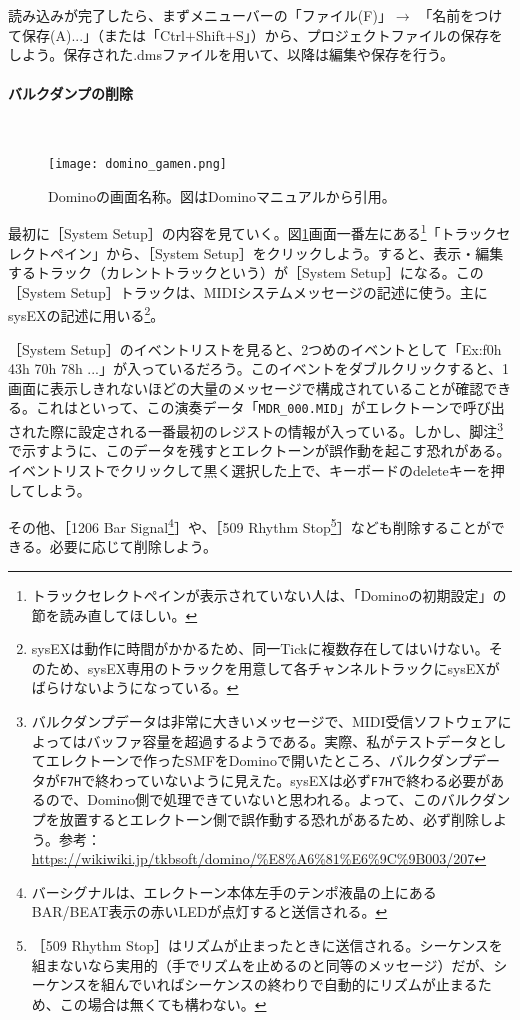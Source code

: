 \documentclass[uplatex, 10pt, dvipdfmx]{jsarticle}
\numberwithin{equation}{section}
\newcommand{\emphj}[1]{\textbf{\textrm{\textgt{{#1}}}}}
\begin{document}
読み込みが完了したら、まずメニューバーの「ファイル(F)」$\rightarrow$ 「名前をつけて保存(A)...」（または「Ctrl$+$Shift$+$S」）から、プロジェクトファイルの保存をしよう。保存された.dmsファイルを用いて、以降は編集や保存を行う。

\paragraph{バルクダンプの削除} \ 

\begin{figure}[h]
  \centering
  \texttt{[image: domino\_gamen.png]}
  \caption{Dominoの画面名称。図はDominoマニュアルから引用。}
  \label{figdominogamen}
\end{figure}


最初に［System Setup］の内容を見ていく。図\ref{figdominogamen}画面一番左にある\footnote{トラックセレクトペインが表示されていない人は、「Dominoの初期設定」の節を読み直してほしい。}「トラックセレクトペイン」から、［System Setup］をクリックしよう。すると、表示・編集するトラック（カレントトラックという）が［System Setup］になる。この［System Setup］トラックは、MIDIシステムメッセージの記述に使う。主にsysEXの記述に用いる\footnote{sysEXは動作に時間がかかるため、同一Tickに複数存在してはいけない。そのため、sysEX専用のトラックを用意して各チャンネルトラックにsysEXがばらけないようになっている。}。

［System Setup］のイベントリストを見ると、2つめのイベントとして「Ex:f0h 43h 70h 78h ...」が入っているだろう。このイベントをダブルクリックすると、1画面に表示しきれないほどの大量のメッセージで構成されていることが確認できる。これは\emphj{バルクダンプ}といって、この演奏データ「\texttt{MDR_000.MID}」がエレクトーンで呼び出された際に設定される一番最初のレジストの情報が入っている。しかし、脚注\footnote{バルクダンプデータは非常に大きいメッセージで、MIDI受信ソフトウェアによってはバッファ容量を超過するようである。実際、私がテストデータとしてエレクトーンで作ったSMFをDominoで開いたところ、バルクダンプデータが\texttt{F7H}で終わっていないように見えた。sysEXは必ず\texttt{F7H}で終わる必要があるので、Domino側で処理できていないと思われる。よって、このバルクダンプを放置するとエレクトーン側で誤作動する恐れがあるため、必ず削除しよう。参考：\url{https://wikiwiki.jp/tkbsoft/domino/%E8%A6%81%E6%9C%9B003/207}}で示すように、このデータを残すとエレクトーンが誤作動を起こす恐れがある。イベントリストでクリックして黒く選択した上で、キーボードのdeleteキーを押して\emphj{必ず削除}しよう。

その他、［1206 Bar Signal\footnote{バーシグナルは、エレクトーン本体左手のテンポ液晶の上にあるBAR/BEAT表示の赤いLEDが点灯すると送信される。}］や、［509 Rhythm Stop\footnote{［509 Rhythm Stop］はリズムが止まったときに送信される。シーケンスを組まないなら実用的（手でリズムを止めるのと同等のメッセージ）だが、シーケンスを組んでいればシーケンスの終わりで自動的にリズムが止まるため、この場合は無くても構わない。}］なども削除することができる。必要に応じて削除しよう。
\end{document}
